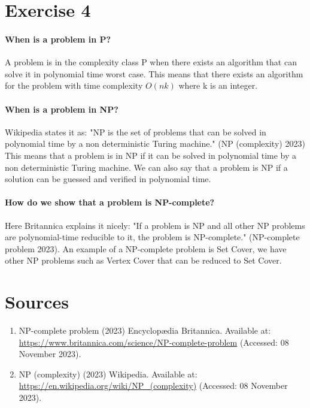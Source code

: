 \documentclass{article}
\begin{document}
\section{Exercise 4}

\paragraph{When is a problem in P?}
A problem is in the complexity class P when there exists an algorithm that can solve it in polynomial time worst case. This means that there exists an algorithm for the problem with time complexity $O(nk)$ where k is an integer.

\paragraph{When is a problem in NP?}
Wikipedia states it as: "NP is the set of problems that can be solved in polynomial time by a non deterministic Turing machine." (NP (complexity) 2023) This means that a problem is in NP if it can be solved in polynomial time by a non deterministic Turing machine. We can also say that a problem is NP if a solution can be guessed and verified in polynomial time.

\paragraph{How do we show that a problem is NP-complete?}
Here Britannica explains it nicely: "If a problem is NP and all other NP problems are polynomial-time reducible to it, the problem is NP-complete." (NP-complete problem 2023). An example of a NP-complete problem is Set Cover, we have other NP problems such as Vertex Cover that can be reduced to Set Cover.


\section{Sources}
\begin{enumerate}
    \item NP-complete problem (2023) Encyclopædia Britannica. Available at: \url{https://www.britannica.com/science/NP-complete-problem} (Accessed: 08 November 2023). 
    \item NP (complexity) (2023) Wikipedia. Available at: \url{https://en.wikipedia.org/wiki/NP_(complexity)} (Accessed: 08 November 2023).
\end{enumerate}
\end{document}
